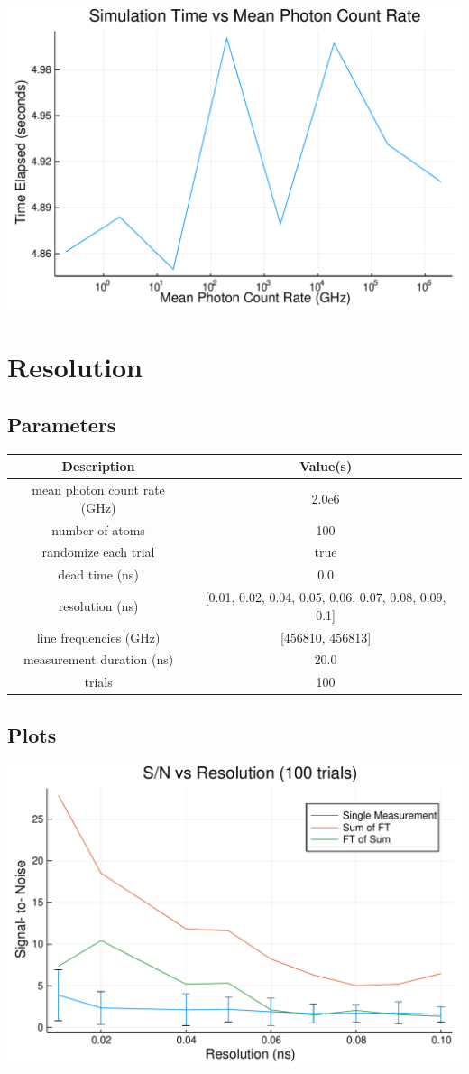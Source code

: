 \documentclass[12pt,a4paper]{article}
\begin{document}
\includegraphics[width=\linewidth]{jl_PKMVtA/simnb_7_1.pdf}

\section{Resolution}


\subsection{Parameters}
\begin{tabular}
{c | c}
Description & Value(s) \\
\hline
mean photon count rate (GHz) & 2.0e6 \\
number of atoms & 100 \\
randomize each trial & true \\
dead time (ns) & 0.0 \\
resolution (ns) & [0.01, 0.02, 0.04, 0.05, 0.06, 0.07, 0.08, 0.09, 0.1] \\
line frequencies (GHz) & [456810, 456813] \\
measurement duration (ns) & 20.0 \\
trials & 100 \\
\end{tabular}
\subsection{Plots}

\includegraphics[width=\linewidth]{jl_PKMVtA/simnb_9_1.pdf}
\end{document}
